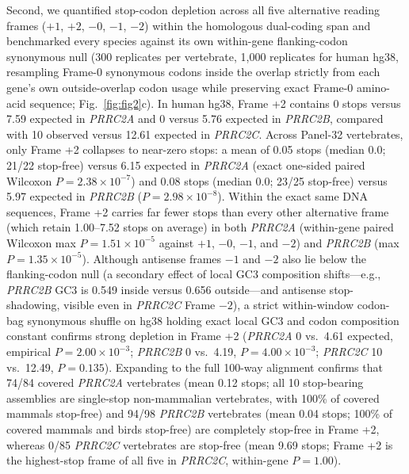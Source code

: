 \documentclass[10pt,letterpaper]{article}
\newcommand{\gene}[1]{\textit{#1}}
\begin{document}
Second, we quantified stop-codon depletion across all five alternative reading frames ($+1$, $+2$, $-0$, $-1$, $-2$) within the homologous dual-coding span and benchmarked every species against its own within-gene flanking-codon synonymous null (300 replicates per vertebrate, 1,000 replicates for human hg38, resampling Frame-0 synonymous codons inside the overlap strictly from each gene's own outside-overlap codon usage while preserving exact Frame-0 amino-acid sequence; Fig.~\ref{fig:fig2}c). In human hg38, Frame +2 contains 0 stops versus 7.59 expected in \gene{PRRC2A} and 0 versus 5.76 expected in \gene{PRRC2B}, compared with 10 observed versus 12.61 expected in \gene{PRRC2C}. Across Panel-32 vertebrates, only Frame +2 collapses to near-zero stops: a mean of 0.05 stops (median 0.0; 21/22 stop-free) versus 6.15 expected in \gene{PRRC2A} (exact one-sided paired Wilcoxon $P = 2.38 \times 10^{-7}$) and 0.08 stops (median 0.0; 23/25 stop-free) versus 5.97 expected in \gene{PRRC2B} ($P = 2.98 \times 10^{-8}$). Within the exact same DNA sequences, Frame +2 carries far fewer stops than every other alternative frame (which retain 1.00--7.52 stops on average) in both \gene{PRRC2A} (within-gene paired Wilcoxon max $P = 1.51 \times 10^{-5}$ against $+1$, $-0$, $-1$, and $-2$) and \gene{PRRC2B} (max $P = 1.35 \times 10^{-5}$). Although antisense frames $-1$ and $-2$ also lie below the flanking-codon null (a secondary effect of local GC3 composition shifts---e.g., \gene{PRRC2B} GC3 is 0.549 inside versus 0.656 outside---and antisense stop-shadowing, visible even in \gene{PRRC2C} Frame $-2$), a strict within-window codon-bag synonymous shuffle on hg38 holding exact local GC3 and codon composition constant confirms strong depletion in Frame +2 (\gene{PRRC2A} 0 vs.\ 4.61 expected, empirical $P = 2.00 \times 10^{-3}$; \gene{PRRC2B} 0 vs.\ 4.19, $P = 4.00 \times 10^{-3}$; \gene{PRRC2C} 10 vs.\ 12.49, $P = 0.135$). Expanding to the full 100-way alignment confirms that 74/84 covered \gene{PRRC2A} vertebrates (mean 0.12 stops; all 10 stop-bearing assemblies are single-stop non-mammalian vertebrates, with 100\% of covered mammals stop-free) and 94/98 \gene{PRRC2B} vertebrates (mean 0.04 stops; 100\% of covered mammals and birds stop-free) are completely stop-free in Frame +2, whereas 0/85 \gene{PRRC2C} vertebrates are stop-free (mean 9.69 stops; Frame +2 is the highest-stop frame of all five in \gene{PRRC2C}, within-gene $P = 1.00$).
\end{document}

